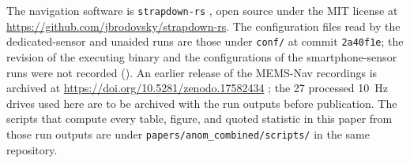 The navigation software is \texttt{strapdown-rs} \citep{strapdown-rs}, open source under the MIT license at \url{https://github.com/jbrodovsky/strapdown-rs}. The configuration files read by the dedicated-sensor and unaided runs are those under \texttt{conf/} at commit \texttt{2a40f1e}; the revision of the executing binary and the configurations of the smartphone-sensor runs were not recorded (). An earlier release of the MEMS-Nav recordings is archived at \url{https://doi.org/10.5281/zenodo.17582434} \citep{mems-nav-dataset}; the 27 processed 10~Hz drives used here are to be archived with the run outputs before publication. The scripts that compute every table, figure, and quoted statistic in this paper from those run outputs are under \texttt{papers/anom\_combined/scripts/} in the same repository.

